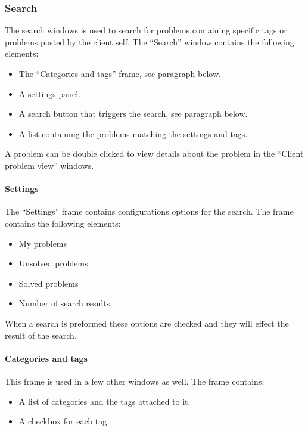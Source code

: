 
\subsubsection{Search}
The search windows is used to search for problems containing specific tags or problems posted by the client self. The ``Search'' window contains the following elements:
\begin{itemize}
	\item The ``Categories and tags'' frame, see paragraph below.
	\item A settings panel.
	\item A search button that triggers the search, see paragraph below.
	\item A list containing the problems matching the settings and tags.
\end{itemize}
A problem can be double clicked to view details about the problem in the ``Client problem view'' windows.

\paragraph{Settings}
The ``Settings'' frame contains configurations options for the search.
The frame contains the following elements:
\begin{itemize}
	\item My problems 
	\item Unsolved problems
	\item Solved problems 
	\item Number of search results
\end{itemize}
When a search is preformed these options are checked and they will effect the result of the search.

\paragraph{Categories and tags} 
This frame is used in a few other windows as well. 
The frame contains:
\begin{itemize}
	\item A list of categories and the tags attached to it. 
	\item A checkbox for each tag.
\end{itemize} 

